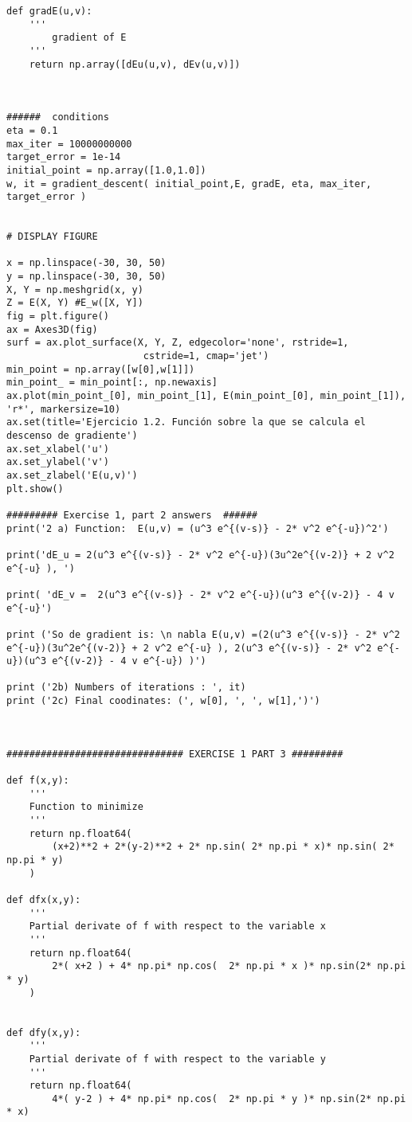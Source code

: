 \begin{verbatim}
def gradE(u,v):
    ''' 
        gradient of E
    '''
    return np.array([dEu(u,v), dEv(u,v)])



######  conditions  
eta = 0.1 
max_iter = 10000000000
target_error = 1e-14
initial_point = np.array([1.0,1.0])
w, it = gradient_descent( initial_point,E, gradE, eta, max_iter, target_error )


# DISPLAY FIGURE

x = np.linspace(-30, 30, 50)
y = np.linspace(-30, 30, 50)
X, Y = np.meshgrid(x, y)
Z = E(X, Y) #E_w([X, Y])
fig = plt.figure()
ax = Axes3D(fig)
surf = ax.plot_surface(X, Y, Z, edgecolor='none', rstride=1,
                        cstride=1, cmap='jet')
min_point = np.array([w[0],w[1]])
min_point_ = min_point[:, np.newaxis]
ax.plot(min_point_[0], min_point_[1], E(min_point_[0], min_point_[1]), 'r*', markersize=10)
ax.set(title='Ejercicio 1.2. Función sobre la que se calcula el descenso de gradiente')
ax.set_xlabel('u')
ax.set_ylabel('v')
ax.set_zlabel('E(u,v)')
plt.show()

######### Exercise 1, part 2 answers  ######
print('2 a) Function:  E(u,v) = (u^3 e^{(v-s)} - 2* v^2 e^{-u})^2')

print('dE_u = 2(u^3 e^{(v-s)} - 2* v^2 e^{-u})(3u^2e^{(v-2)} + 2 v^2 e^{-u} ), ')

print( 'dE_v =  2(u^3 e^{(v-s)} - 2* v^2 e^{-u})(u^3 e^{(v-2)} - 4 v e^{-u}')

print ('So de gradient is: \n nabla E(u,v) =(2(u^3 e^{(v-s)} - 2* v^2 e^{-u})(3u^2e^{(v-2)} + 2 v^2 e^{-u} ), 2(u^3 e^{(v-s)} - 2* v^2 e^{-u})(u^3 e^{(v-2)} - 4 v e^{-u}) )')

print ('2b) Numbers of iterations : ', it)
print ('2c) Final coodinates: (', w[0], ', ', w[1],')')



############################### EXERCISE 1 PART 3 #########

def f(x,y):
    '''
    Function to minimize
    '''
    return np.float64(
        (x+2)**2 + 2*(y-2)**2 + 2* np.sin( 2* np.pi * x)* np.sin( 2* np.pi * y)
    )

def dfx(x,y):
    '''
    Partial derivate of f with respect to the variable x
    '''
    return np.float64(
        2*( x+2 ) + 4* np.pi* np.cos(  2* np.pi * x )* np.sin(2* np.pi * y)
    )


def dfy(x,y):
    '''
    Partial derivate of f with respect to the variable y
    '''
    return np.float64(
        4*( y-2 ) + 4* np.pi* np.cos(  2* np.pi * y )* np.sin(2* np.pi * x)


\end{verbatim}
